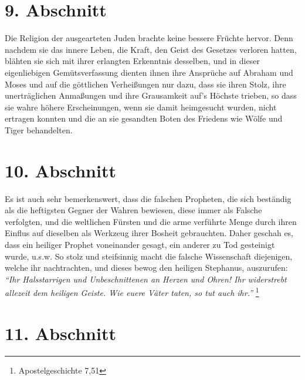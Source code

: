 \section{9. Abschnitt} \label{kap7_ab9}

Die Religion der ausgearteten Juden brachte
keine bessere Früchte hervor. Denn
nachdem sie das innere Leben, die Kraft, den Geist des
Gesetzes verloren hatten,
blähten sie sich mit ihrer erlangten Erkenntnis desselben, und in dieser
eigenliebigen Gemütsverfassung dienten ihnen ihre Ansprüche auf
Abraham und
Moses und auf die göttlichen
Verheißungen nur dazu, dass sie ihren Stolz, ihre
unerträglichen Anmaßungen und ihre
Grausamkeit auf's Höchste trieben, so dass sie
wahre höhere Erscheinungen, wenn sie damit heimgesucht
wurden, nicht ertragen
konnten und die an sie gesandten Boten des Friedens wie Wölfe und Tiger
behandelten.

\section{10. Abschnitt} \label{kap7_ab10}

Es ist auch sehr bemerkenswert, dass die falschen
Propheten, die sich beständig
als die heftigsten Gegner der Wahren bewiesen, diese immer als Falsche
verfolgten, und die weltlichen Fürsten und
die arme verführte Menge durch ihren
Einflus auf dieselben als Werkzeug ihrer Bosheit gebrauchten. Daher geschah es,
dass ein heiliger Prophet voneinander gesagt, ein anderer zu Tod gesteinigt
wurde, u.s.w. So stolz und steifsinnig macht die falsche
Wissenschaft
diejenigen, welche ihr nachtrachten, und dieses bewog den heiligen
 Stephanus,
auszurufen:
\textit{"`Ihr Halsstarrigen und Unbeschnittenen an Herzen und Ohren! Ihr
widerstrebt allezeit dem heiligen Geiste. Wie euere Väter taten, so tut auch
ihr."'}
\footnote{Apostelgeschichte 7,51}

\section{11. Abschnitt} \label{kap7_ab11}

